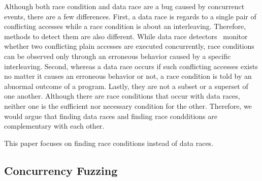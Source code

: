 %
%
%
Although both race condition and data race are a bug caused by
concurrenct events, there are a few differences.
%
First, a data race is regards to a single pair of conflicting accesses
while a race condition is about an interleaving.
%
Therefore, methods to detect them are also different.  While data race
detectors~\cite{tsan, krace, prorace, crsampler, txrace} monitor
whether two conflicting plain accesses are executed concurrently, race
conditions can be observed only through an erroneous behavior caused
by a specific interleaving.
%
Second, whereas a data race occurs if such conflicting accesses exists
no matter it causes an erroneous behavior or not, a race condition is
told by an abnormal outcome of a program.
%
%
%
Lastly, they are not a subset or a superset of one another. Although
there are race conditions that occur with data races, neither one is
the sufficient nor necessary condition for the other. Therefore, we
would argue that finding data races and finding race condditions are
complementary with each other.


%
This paper focuses on finding race conditions instead of data races.




\subsection{Concurrency Fuzzing}
\label{ss:concurrencyfuzzing}

